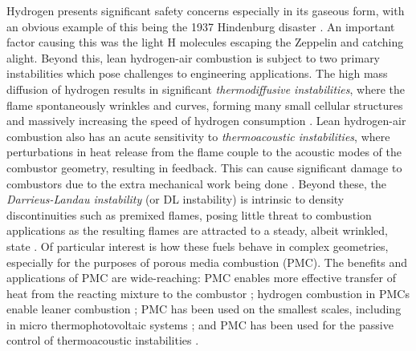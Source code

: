 Hydrogen presents significant safety concerns \cite{green2006HydrogenSafetyIssues} especially in its gaseous form, with an obvious example of this being the 1937 Hindenburg disaster \cite{dilisi2017HindenburgDisasterCombining}. An important factor causing this was the light H molecules escaping the Zeppelin and catching alight. Beyond this, lean hydrogen-air combustion is subject to two primary instabilities which pose challenges to engineering applications. The high mass diffusion of hydrogen results in significant \emph{thermodiffusive instabilities}, where the flame spontaneously wrinkles and curves, forming many small cellular structures \cite{sivashinsky1983InstabilitiesPatternFormation} and massively increasing the speed of hydrogen consumption \cite{howarth2023ThermodiffusivelyUnstableLeanPremixed}. Lean hydrogen-air combustion also has an acute sensitivity to \emph{thermoacoustic instabilities}, where perturbations in heat release from the flame couple to the acoustic modes of the combustor geometry, resulting in feedback. This can cause significant damage to combustors due to the extra mechanical work being done \cite{morgans2024ThermoacousticInstabilityCombustors}. Beyond these, the \emph{Darrieus-Landau instability} (or DL instability) is intrinsic to density discontinuities such as premixed flames, posing little threat to combustion applications as the resulting flames are attracted to a steady, albeit wrinkled, state \cite{matalon2018DarrieusLandauInstability}. Of particular interest is how these fuels behave in complex geometries, especially for the purposes of porous media combustion (PMC). The benefits and applications of PMC are wide-reaching: PMC enables more effective transfer of heat from the reacting mixture to the combustor \cite{mujeebu2009CombustionPorousMedia}; hydrogen combustion in PMCs enable leaner combustion \cite{tseng2002EffectsHydrogenAddition}; PMC has been used on the smallest scales, including in micro thermophotovoltaic systems \cite{pan2015HydrogenOxygenPremixed}; and PMC has been used for the passive control of thermoacoustic instabilities \cite{meadows2015PorousInsertsPassive, dowd2018ThermoacousticInstabilityModel}.

